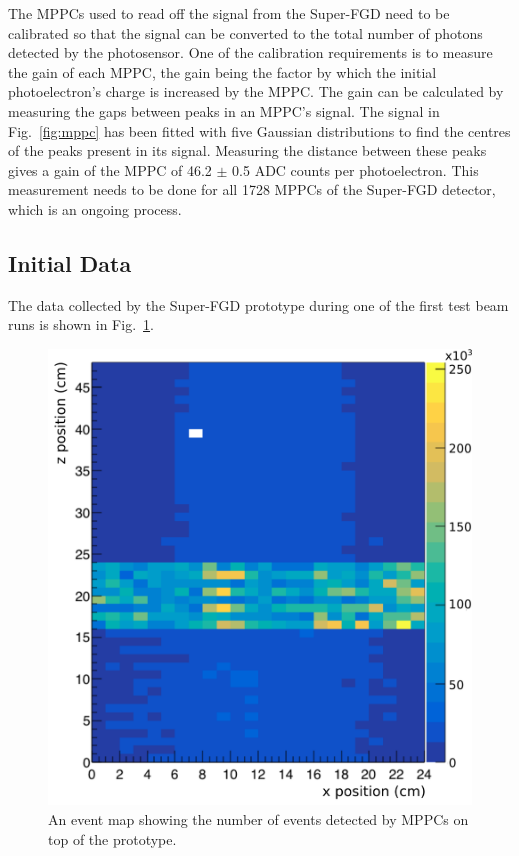 \documentclass[aps,pra,12pt,notitlepage,tightenlines]{revtex4-1}
\begin{document}
The MPPCs used to read off the signal from the Super-FGD need to be calibrated so that the signal can be converted to the total number of photons detected by the photosensor. One of the calibration requirements is to measure the gain of each MPPC, the gain being the factor by which the initial photoelectron's charge is increased by the MPPC. The gain can be calculated by measuring the gaps between peaks in an MPPC's signal. The signal in Fig.\ \ref{fig:mppc} has been fitted with five Gaussian distributions to find the centres of the peaks present in its signal. Measuring the distance between these peaks gives a gain of the MPPC of 46.2 $\pm$ 0.5 ADC counts per photoelectron. This measurement needs to be done for all 1728 MPPCs of the Super-FGD detector, which is an ongoing process.

\subsection{Initial Data}
The data collected by the Super-FGD prototype during one of the first test beam runs is shown in Fig.\ \ref{fig:hit}.
\begin{figure}
 \includegraphics[scale=0.5]{hit_event2}
 \caption{An event map showing the number of events detected by MPPCs on top of the prototype.}
 \label{fig:hit}
\end{figure}
\end{document}
